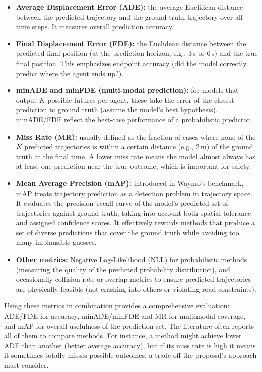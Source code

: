 \documentclass[12pt,a4paper]{report}
\begin{document}
\begin{itemize}
    \item \textbf{Average Displacement Error (ADE):} the average Euclidean distance between the predicted trajectory and the ground-truth trajectory over all time steps. It measures overall prediction accuracy.
    \item \textbf{Final Displacement Error (FDE):} the Euclidean distance between the predicted final position (at the prediction horizon, e.g., \(3\,\mathrm{s}\) or \(6\,\mathrm{s}\)) and the true final position. This emphasizes endpoint accuracy (did the model correctly predict where the agent ends up?).
    \item \textbf{minADE and minFDE (multi-modal prediction):} for models that output \(K\) possible futures per agent, these take the error of the closest prediction to ground truth (assume the model’s best hypothesis). minADE/FDE reflect the best-case performance of a probabilistic predictor.
    \item \textbf{Miss Rate (MR):} usually defined as the fraction of cases where none of the \(K\) predicted trajectories is within a certain distance (e.g., \(2\,\mathrm{m}\)) of the ground truth at the final time. A lower miss rate means the model almost always has at least one prediction near the true outcome, which is important for safety.
    \item \textbf{Mean Average Precision (mAP):} introduced in Waymo’s benchmark, mAP treats trajectory prediction as a detection problem in trajectory space. It evaluates the precision–recall curve of the model’s predicted set of trajectories against ground truth, taking into account both spatial tolerance and assigned confidence scores. It effectively rewards methods that produce a set of diverse predictions that cover the ground truth while avoiding too many implausible guesses.
    \item \textbf{Other metrics:} Negative Log-Likelihood (NLL) for probabilistic methods (measuring the quality of the predicted probability distribution), and occasionally collision rate or overlap metrics to ensure predicted trajectories are physically feasible (not crashing into others or violating road constraints).
\end{itemize}

Using these metrics in combination provides a comprehensive evaluation: ADE/FDE for accuracy, minADE/minFDE and MR for multimodal coverage, and mAP for overall usefulness of the prediction set. The literature often reports all of them to compare methods. For instance, a method might achieve lower ADE than another (better average accuracy), but if its miss rate is high it means it sometimes totally misses possible outcomes, a trade-off the proposal’s approach must consider.
\end{document}
